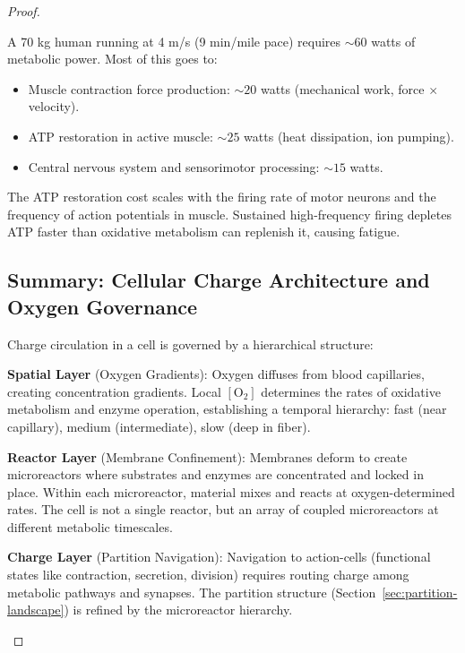 \begin{corollary}
\begin{proof}
\begin{example}
\label{ex:running-cost}
A 70 kg human running at 4 m/s (9 min/mile pace) requires $\sim 60$ watts of metabolic power. Most of this goes to:
\begin{itemize}[noitemsep]
\item Muscle contraction force production: $\sim 20$ watts (mechanical work, force $\times$ velocity).
\item ATP restoration in active muscle: $\sim 25$ watts (heat dissipation, ion pumping).
\item Central nervous system and sensorimotor processing: $\sim 15$ watts.
\end{itemize}

The ATP restoration cost scales with the firing rate of motor neurons and the frequency of action potentials in muscle. Sustained high-frequency firing depletes ATP faster than oxidative metabolism can replenish it, causing fatigue.
\end{example}

\subsection{Summary: Cellular Charge Architecture and Oxygen Governance}
\label{subsec:cellular-summary}

\begin{principle}
Charge circulation in a cell is governed by a hierarchical structure:

\textbf{Spatial Layer} (Oxygen Gradients): Oxygen diffuses from blood capillaries, creating concentration gradients. Local $[\text{O}_2]$ determines the rates of oxidative metabolism and enzyme operation, establishing a temporal hierarchy: fast (near capillary), medium (intermediate), slow (deep in fiber).

\textbf{Reactor Layer} (Membrane Confinement): Membranes deform to create microreactors where substrates and enzymes are concentrated and locked in place. Within each microreactor, material mixes and reacts at oxygen-determined rates. The cell is not a single reactor, but an array of coupled microreactors at different metabolic timescales.

\textbf{Charge Layer} (Partition Navigation): Navigation to action-cells (functional states like contraction, secretion, division) requires routing charge among metabolic pathways and synapses. The partition structure (Section~\ref{sec:partition-landscape}) is refined by the microreactor hierarchy.


\end{principle}
\end{proof}
\end{corollary}
